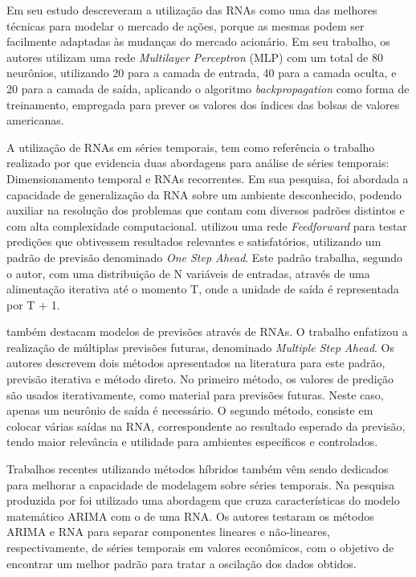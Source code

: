 Em seu estudo  descreveram a utilização das RNAs como uma das melhores técnicas para modelar o mercado de ações, porque as mesmas podem ser facilmente adaptadas às mudanças do mercado acionário. Em seu trabalho, os autores utilizam uma rede \textit{Multilayer Perceptron} (MLP) com um total de 80 neurônios, utilizando 20 para a camada de entrada, 40 para a camada oculta, e 20 para a camada de saída, aplicando o algoritmo \textit{backpropagation} como forma de treinamento, empregada para prever os valores dos índices das bolsas de valores americanas.

A utilização de RNAs em séries temporais, tem como referência o trabalho realizado por  que evidencia duas abordagens para análise de séries temporais: Dimensionamento temporal e RNAs recorrentes. Em sua pesquisa, foi abordada a capacidade de generalização da RNA sobre um ambiente desconhecido, podendo auxiliar na resolução dos problemas que contam com diversos padrões distintos e com alta complexidade computacional.  utilizou uma rede \textit{Feedforward} para testar predições que obtivessem resultados relevantes e satisfatórios, utilizando um padrão de previsão denominado \textit{One Step Ahead}. Este padrão trabalha, segundo o autor, com uma distribuição de  N variáveis de entradas, através de uma alimentação iterativa até o momento T, onde a unidade de saída é representada por T + 1.

 também destacam modelos de previsões através de RNAs. O trabalho enfatizou a realização de múltiplas previsões futuras, denominado \textit{Multiple Step Ahead}. Os autores descrevem dois métodos apresentados na literatura para  este padrão, previsão iterativa e método direto. No primeiro método, os  valores de predição são usados iterativamente, como material para previsões futuras. Neste caso, apenas um neurônio de saída é necessário. O segundo método, consiste em colocar várias saídas na RNA, correspondente ao resultado esperado da previsão, tendo maior  relevância e utilidade  para ambientes específicos e controlados.

Trabalhos recentes utilizando métodos híbridos também vêm sendo dedicados para melhorar a capacidade de modelagem sobre séries temporais. Na pesquisa produzida por  foi utilizado uma abordagem que cruza características do modelo matemático ARIMA com o de uma RNA. Os autores testaram os métodos ARIMA e RNA para separar componentes lineares e não-lineares, respectivamente, de séries temporais em valores econômicos, com o objetivo de encontrar um melhor padrão para tratar a oscilação dos dados obtidos.

